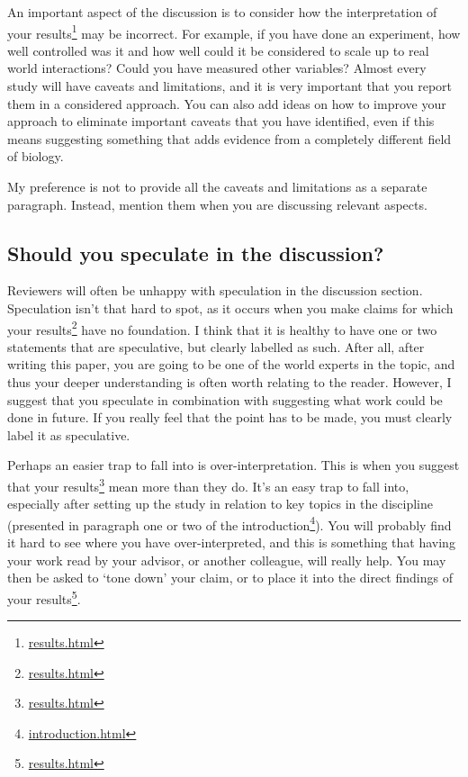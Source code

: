 \documentclass[
]{krantz}
\renewcommand{\href}[2]{#2\footnote{\url{#1}}}
\begin{document}
An important aspect of the discussion is to consider how the interpretation of your \href{results.html}{results} may be incorrect. For example, if you have done an experiment, how well controlled was it and how well could it be considered to scale up to real world interactions? Could you have measured other variables? Almost every study will have caveats and limitations, and it is very important that you report them in a considered approach. You can also add ideas on how to improve your approach to eliminate important caveats that you have identified, even if this means suggesting something that adds evidence from a completely different field of biology.

My preference is not to provide all the caveats and limitations as a separate paragraph. Instead, mention them when you are discussing relevant aspects.

\hypertarget{speculation}{%
\subsection{Should you speculate in the discussion?}\label{speculation}}

Reviewers will often be unhappy with speculation in the discussion section. Speculation isn't that hard to spot, as it occurs when you make claims for which your \href{results.html}{results} have no foundation. I think that it is healthy to have one or two statements that are speculative, but clearly labelled as such. After all, after writing this paper, you are going to be one of the world experts in the topic, and thus your deeper understanding is often worth relating to the reader. However, I suggest that you speculate in combination with suggesting what work could be done in future. If you really feel that the point has to be made, you must clearly label it as speculative.

Perhaps an easier trap to fall into is over-interpretation. This is when you suggest that your \href{results.html}{results} mean more than they do. It's an easy trap to fall into, especially after setting up the study in relation to key topics in the discipline (presented in paragraph one or two of the \href{introduction.html}{introduction}). You will probably find it hard to see where you have over-interpreted, and this is something that having your work read by your advisor, or another colleague, will really help. You may then be asked to `tone down' your claim, or to place it into the direct findings of your \href{results.html}{results}.
\end{document}
